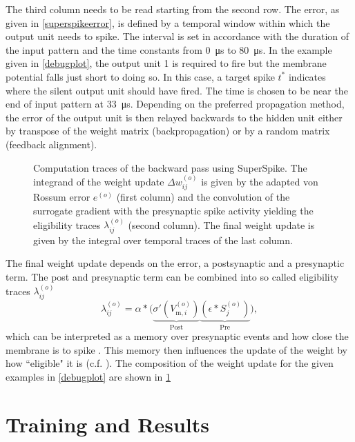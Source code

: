 The third column needs to be read starting from the second row. The error, as given in \cref{superspikeerror}, is defined by a temporal window within which the output unit needs to spike.
The interval is set in accordance with the duration of the input pattern and the time constants from \SI{0}{\micro \s} to \SI{80}{\micro \s}. In the example given in \cref{debugplot}, the output unit 1 is required to fire but the membrane potential falls just short to doing so. In this case, a target spike $t^*$ indicates where the silent output unit should have fired. The time is chosen to be near the end of input pattern at \SI{33}{\micro \s}. Depending on the preferred propagation method, the error of the output unit is then relayed backwards to the hidden unit either by transpose of the weight matrix (backpropagation) or by a random matrix (feedback alignment).

\begin{figure}
	\centering
	
	\caption[Weight update in the backward pass using SuperSpike.]{Computation traces of the backward pass using SuperSpike. The integrand of the weight update $\Delta w_{ij}^{(o)}$ is given by the adapted von Rossum error $e^{(o)}$ (first column) and the convolution of the surrogate gradient with the presynaptic spike activity yielding the eligibility traces $\lambda_{ij}^{(o)}$ (second column). The final weight update is given by the integral over temporal traces of the last column.}
	\label{weightchangesplot}
\end{figure}

The final weight update depends on the error, a postsynaptic and a presynaptic term. The post and presynaptic term can be combined into so called eligibility traces $\lambda_{ij}^{(o)}$
\begin{equation*}
\lambda_{ij}^{(o)} = \alpha \ast 
\Big(\underbrace{\sigma'(V^{(o)}_{\text{m},i})}_{\text{Post}} 
\underbrace{\left(\epsilon \ast S_j^{(o)}\right)}_{\text{Pre}}\Big),
\end{equation*}
which can be interpreted as a memory over presynaptic events and how close the membrane is to spike . This memory then influences the update of the weight by how ``eligible" it is (c.f. \citealp{sutton2011reinforcement}). The composition of the weight update for the given examples in \cref{debugplot} are shown in \cref{weightchangesplot}

\section{Training and Results}

